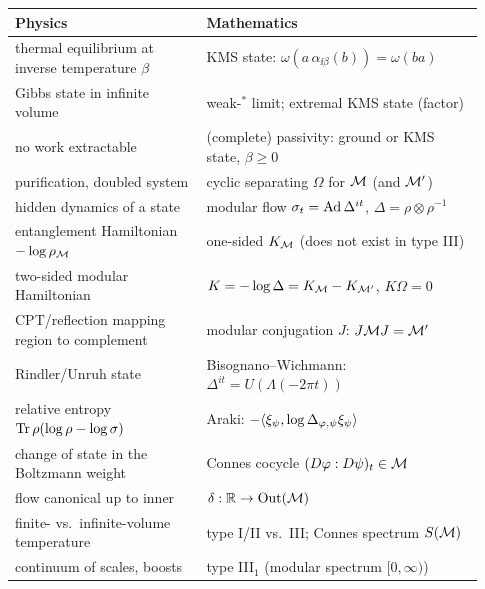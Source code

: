 \begin{dictbox}
\renewcommand{\arraystretch}{1.3}
\begin{tabular}{@{}p{0.38\linewidth}p{0.55\linewidth}@{}}
\textbf{Physics} & \textbf{Mathematics}\\
\hline
thermal equilibrium at inverse temperature $\beta$ & KMS state: $\omega(a\,\alpha_{\ii\beta}(b))=\omega(ba)$\\
Gibbs state in infinite volume & weak-$^*$ limit; extremal KMS state (factor)\\
no work extractable & (complete) passivity: ground or KMS state, $\beta\ge0$\\
purification, doubled system & cyclic separating $\Omega$ for $\mathcal{M}$ (and $\mathcal{M}'$)\\
hidden dynamics of a state & modular flow $\sigma_t=\operatorname{Ad}\Delta^{it}$, $\Delta=\rho\otimes\rho^{-1}$\\
entanglement Hamiltonian $-\log\rho_{\mathcal{M}}$ & one-sided $K_{\mathcal{M}}$ (does not exist in type III)\\
two-sided modular Hamiltonian & $K=-\log\Delta=K_{\mathcal{M}}-K_{\mathcal{M}'}$, $K\Omega=0$\\
CPT/reflection mapping region to complement & modular conjugation $J$: $J\mathcal{M} J=\mathcal{M}'$\\
Rindler/Unruh state & Bisognano--Wichmann: $\Delta^{it}=U(\Lambda(-2\pi t))$\\
relative entropy $\operatorname{Tr}\rho(\log\rho-\log\sigma)$ & Araki: $-\langle \xi_\psi,\log\Delta_{\varphi,\psi}\xi_\psi\rangle$\\
change of state in the Boltzmann weight & Connes cocycle $(D\varphi:D\psi)_t\in\mathcal{M}$\\
flow canonical up to inner & $\delta:\mathbb{R}\to\mathrm{Out}(\mathcal{M})$\\
finite- vs.\ infinite-volume temperature & type I/II vs.\ III; Connes spectrum $S(\mathcal{M})$\\
continuum of scales, boosts & type III$_1$ (modular spectrum $[0,\infty)$)\\
\end{tabular}
\end{dictbox}
